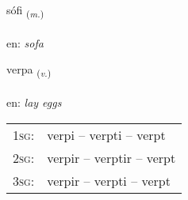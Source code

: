 \documentclass[frontgrid, backgrid]{flacards}\usepackage[]{graphicx}\usepackage[]{xcolor}
\begin{document}
\renewcommand{\flhead}{\vskip5pt \fboxsep=0pt {\small\bfseries\footnotesize Nafnorð | Noun}}
\renewcommand{\fcfoot}{\vskip5pt \fboxsep=0pt \hspace{2pt}{\small\bfseries\footnotesize 3K}}

\renewcommand{\blhead}{\vskip5pt {\small\bfseries\footnotesize Nafnorð | Noun }}
\renewcommand{\bcfoot}{\vskip5pt \hspace{2pt}{\small\bfseries\footnotesize 3K}}


{sófi \small{\textsubscript{(\textit{m.})}} \\[1ex] %
\textphonetic{[souːfɪ]} \\
en: \emph{sofa} \\  [2ex]
\renewcommand*{\arraystretch}{0.8}
}

\renewcommand{\flhead}{\vskip5pt \fboxsep=0pt {\small\bfseries\footnotesize Sagnorð | Verb}}
\renewcommand{\fcfoot}{\vskip5pt \fboxsep=0pt \hspace{2pt}{\small\bfseries\footnotesize 3K}}

\renewcommand{\blhead}{\vskip5pt {\small\bfseries\footnotesize Sagnorð | Verb }}
\renewcommand{\bcfoot}{\vskip5pt \hspace{2pt}{\small\bfseries\footnotesize 3K}}


{verpa \small{\textsubscript{(\textit{v.})}} \\[1ex] %
\textphonetic{[vɛr̥pa]} \\
en: \emph{lay eggs} \\  [2ex]
\renewcommand*{\arraystretch}{0.8}
\begin{tabular}{p{1cm}l}
\textsc{1sg}: & verpi -- verpti -- verpt \\ 
\textsc{2sg}: & verpir -- verptir -- verpt \\ 
\textsc{3sg}: & verpir -- verpti -- verpt \\ 
\end{tabular}
}
\end{document}
